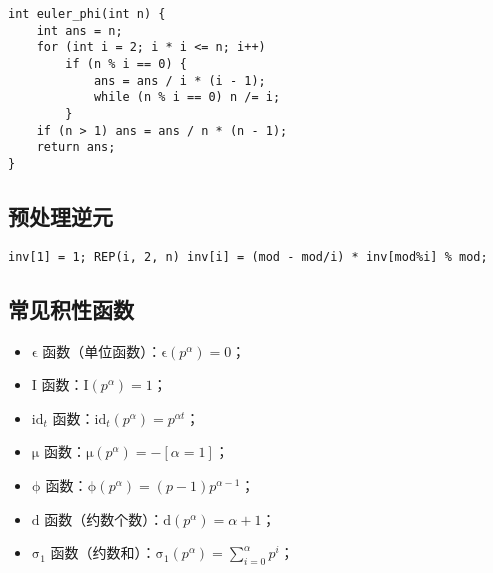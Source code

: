 \documentclass[a4paper,landscape,twocolumn]{ctexart}
\begin{document}
\begin{lstlisting}[]
int euler_phi(int n) {
	int ans = n;
	for (int i = 2; i * i <= n; i++)
		if (n % i == 0) {
			ans = ans / i * (i - 1);
			while (n % i == 0) n /= i;
		}
	if (n > 1) ans = ans / n * (n - 1);
	return ans;
}
\end{lstlisting}

\subsection{预处理逆元}

\begin{lstlisting}[]
inv[1] = 1; REP(i, 2, n) inv[i] = (mod - mod/i) * inv[mod%i] % mod;
\end{lstlisting}

%

\subsection{常见积性函数}

\begin{itemize}
\item $\mathrm{\epsilon}$ 函数（单位函数）：$\mathrm{\epsilon} (p ^ \alpha) = 0$；
\item $\mathrm{I}$ 函数：$\mathrm{I} (p ^ \alpha) = 1$；
\item $\mathrm{id}_t$ 函数：$\mathrm{id}_t (p ^ \alpha) = p ^ {\alpha t}$；
\item $\mathrm{\mu}$ 函数：$\mathrm{\mu} (p ^ \alpha) = - \left [ \alpha = 1 \right ]$；
\item $\mathrm{\phi}$ 函数：$\mathrm{\phi} (p ^ \alpha) = (p - 1) p ^ {\alpha - 1}$；
\item $\mathrm{d}$ 函数（约数个数）：$\mathrm{d} (p ^ \alpha) = \alpha + 1$；
\item $\mathrm{\sigma}_1$ 函数（约数和）：$\mathrm{\sigma}_1 (p ^ \alpha) = \sum_{i = 0}^{\alpha} p ^ i$；
\end{itemize}
\end{document}
